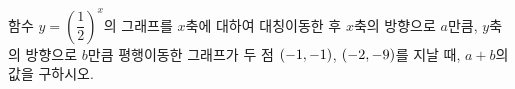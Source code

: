 함수 $y=\left(\dfrac{1}{2}\right)^{x}$의 그래프를 $x$축에 대하여 대칭이동한 후 $x$축의 방향으로 $a$만큼, $y$축의 방향으로 $b$만큼 평행이동한 그래프가 두 점 $(-1{,}\mkern3mu\mathopen{}-1)$, $(-2{,}\mkern3mu\mathopen{}-9)$를 지날 때, $a+b$의 값을 구하시오.
